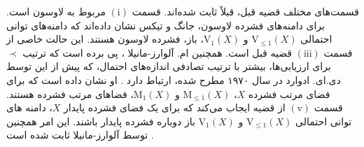 \documentclass[12pt,a4paper]{article}
\theoremstyle{definition}
\newtheorem{definition}{تعریف}[section]
\theoremstyle{theorem}
\newtheorem{theorem}[definition]{قضیه}
\newtheorem{proposition}[definition]{گزاره}
\newtheorem{corollary}[definition]{نتیجه}
\newtheorem{remark}[definition]{ملاحظه}
\theoremstyle{definition}
\newtheorem{example}[definition]{مثال}
\newcommand{\rM}{\mathrm{M}}
\newcommand{\rV}{\mathrm{V}}
\begin{document}
قسمت‌های مختلف قضیه قبل،  قبلاً ثابت شده‌اند.   قسمت
$ \mathrm{(i)} $
مربوط به لاوسون
\cite{lawson}
است.   برای دامنه‌های فشرده لاوسون،   جانگ و تیکس
\cite{Jung and Tix}
نشان داده‌اند که دامنه‌های توانی احتمالی 
$ \rV_{\leq1}(X) $
و
$ \rV_{1}(X)$، باز،  فشرده لاوسون هستند. این حالت خاصی از قسمت 
$ \mathrm{(iii)} $
قضیه قبل است.  همچنین  ام. آلوارز-مانیلا
\cite{Alvarez2,Alvarez1}، پی برده است که ترتیب 
$ \prec $
برای ارزیابی‌ها، بیشتر با ترتیب تصادفی اندازه‌های احتمال،  که پیش از این توسط
 دی.ای. ادوارد در سال ۱۹۷۰ مطرح شده، ارتباط دارد 
\cite{D.A. Edwards}.  او نشان داده است که برای فضای مرتب فشرده 
$ X $،  
$ \rM_{\leq 1}(X) $
و
$ \rM_{1}(X) $،  فضاهای مرتب فشرده هستند.   قسمت
$ \mathrm{(v)}  $
از قضیه ایجاب می‌کند که برای یک فضای فشرده پایدار
$ X $،   دامنه های توانی احتمالی 
$ \rV_{\leq 1}(X) $
و
$ \rV_{ 1}(X) $
باز دوباره فشرده پایدار باشند.   این امر همچنین توسط آلوارز-مانیلا ثابت شده است
\cite{Alvarez2}.
\end{document}
